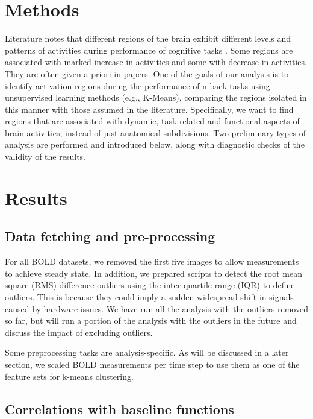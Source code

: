 \documentclass[11pt]{article}
\begin{document}
\section{Methods}

Literature notes that different regions of the brain exhibit different levels
and patterns of activities during performance of cognitive tasks
\cite{fox2005}. Some regions are associated with marked increase in
activities and some with decrease in activities. They are often given a priori
in papers. One of the goals of our analysis is to identify activation regions
during the performance of n-back tasks using unsupervised learning methods
(e.g., K-Means), comparing the regions isolated in this manner with those
assumed in the literature. Specifically, we want to find regions that are
associated with dynamic, task-related and functional aspects of brain
activities, instead of just anatomical subdivisions. Two preliminary types of
analysis are performed and introduced below, along with diagnostic checks of 
the
validity of the results. 

\section{Results}

\subsection{Data fetching and pre-processing}

For all BOLD datasets, we removed the first five images to allow measurements 
to
achieve steady state. In addition, we prepared scripts to detect the root mean
square (RMS) difference outliers using the inter-quartile range (IQR) to define
outliers. This is because they could imply a sudden widespread shift in signals
caused by hardware issues. We have run all the analysis with the outliers
removed so far, but will run a portion of the analysis with the outliers in the
future and discuss the impact of excluding outliers. 

Some preprocessing tasks are analysis-specific. As will be discussed in a later
section, we scaled BOLD measurements per time step to use them as one of the
feature sets for k-means clustering. 

\subsection{Correlations with baseline functions}
\end{document}
